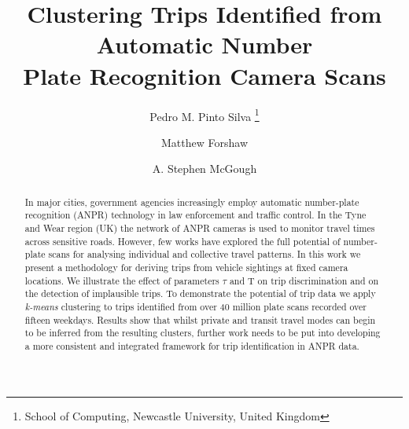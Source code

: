 \documentclass[twoside,leqno,twocolumn]{article}
\newcommand{\Tau}{\mathrm{T}}
\begin{document}

\title{\Large Clustering Trips Identified from Automatic Number \\ Plate Recognition Camera Scans}
\author{Pedro M. Pinto Silva \thanks{School of Computing, Newcastle University, United Kingdom}
\and
Matthew Forshaw\footnotemark[1]
\and
A. Stephen McGough\footnotemark[1]}
\date{}

\maketitle








\begin{abstract} \small\baselineskip=9pt In major cities, government agencies increasingly employ automatic number-plate recognition (ANPR) technology in law enforcement and traffic control. In the Tyne and Wear region (UK) the network of ANPR cameras is used to monitor travel times across sensitive roads. However, few works have explored the full potential of number-plate scans for analysing individual and collective travel patterns. In this work we present a methodology for deriving trips from vehicle sightings at fixed camera locations. We illustrate the effect of parameters $\tau$ and $\Tau$ on trip discrimination and on the detection of implausible trips. To demonstrate the potential of trip data we apply \emph{k-means} clustering to trips identified from over 40 million plate scans recorded over fifteen weekdays. Results show that whilst private and transit travel modes can begin to be inferred from the resulting clusters, further work needs to be put into developing a more consistent and integrated framework for trip identification in ANPR data.\end{abstract}
\end{document}
